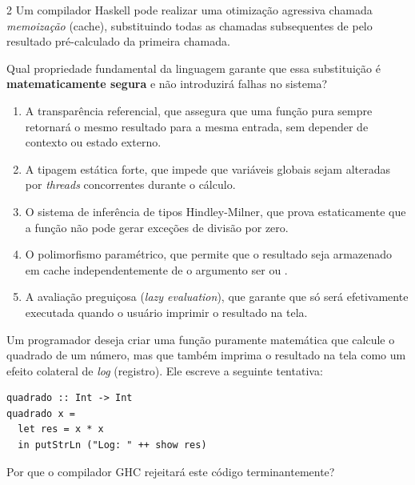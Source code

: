 \documentclass[a4paper,10pt,brazil]{article}
\begin{document}
\begin{multicols}{2}
Um compilador Haskell pode realizar uma otimização agressiva chamada \emph{memoização} (cache), substituindo todas as chamadas subsequentes de  pelo resultado pré-calculado da primeira chamada. 

Qual propriedade fundamental da linguagem garante que essa substituição é \textbf{matematicamente segura} e não introduzirá falhas no sistema?

\begin{enumerate}
  \item A transparência referencial, que assegura que uma função pura sempre retornará o mesmo resultado para a mesma entrada, sem depender de contexto ou estado externo.

  \item A tipagem estática forte, que impede que variáveis globais sejam alteradas por \textit{threads} concorrentes durante o cálculo.

  \item O sistema de inferência de tipos Hindley-Milner, que prova estaticamente que a função não pode gerar exceções de divisão por zero.

  \item O polimorfismo paramétrico, que permite que o resultado seja armazenado em cache independentemente de o argumento ser  ou .

  \item A avaliação preguiçosa (\emph{lazy evaluation}), que garante que  só será efetivamente executada quando o usuário imprimir o resultado na tela.


\end{enumerate}

Um programador deseja criar uma função puramente matemática que calcule o quadrado de um número, mas que também imprima o resultado na tela como um efeito colateral de \emph{log} (registro). Ele escreve a seguinte tentativa:

\begin{verbatim}
quadrado :: Int -> Int
quadrado x = 
  let res = x * x
  in putStrLn ("Log: " ++ show res)
\end{verbatim}

Por que o compilador GHC rejeitará este código terminantemente?


\end{multicols}
\end{document}
